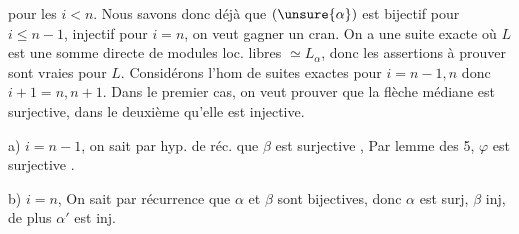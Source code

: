 
pour les $i<n$.  Nous savons donc déjà
que $(\unsure{\alpha})$ est bijectif pour $i\leq n-1$,
injectif pour $i=n$, on veut gagner un cran.
On a une suite exacte
où  $L$ est une somme directe de
modules loc. libres  $\simeq L_\alpha$,
donc les assertions à prouver sont vraies pour $L$.
Considérons l'hom de suites exactes
pour $i=n-1,n$ donc $i+1=n,n+1$.
Dans le premier cas, on veut prouver que la flèche médiane
est surjective, dans le deuxième qu'elle est injective.

a) $i=n-1$, on sait par hyp. de réc. que $\beta$ est
surjective 
,
Par lemme des 5, $\varphi$ est  surjective
.

b) $i=n$, On sait par 
récurrence que $\alpha$ et $\beta$ sont bijectives,
donc $\alpha$ est surj, $\beta$ inj, de plus $\alpha'$ est inj.


